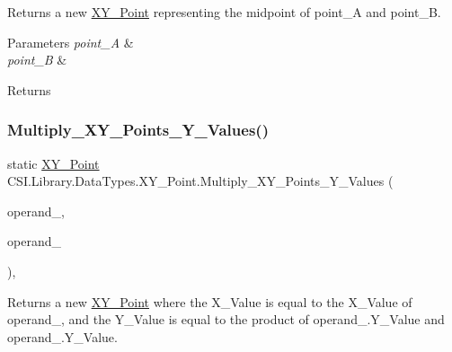 Returns a new \mbox{\hyperlink{struct_c_s_i_1_1_library_1_1_data_types_1_1_x_y___point}{X\+Y\+\_\+\+Point}} representing the midpoint of point\+\_\+A and point\+\_\+B. 


\begin{DoxyParams}{Parameters}
{\em point\+\_\+A} & \\
\hline
{\em point\+\_\+B} & \\
\hline
\end{DoxyParams}
\begin{DoxyReturn}{Returns}

\end{DoxyReturn}
\mbox{\label{struct_c_s_i_1_1_library_1_1_data_types_1_1_x_y___point_ab302194d8398608888249acc07a0b749}} 
\subsubsection{\texorpdfstring{Multiply\_XY\_Points\_Y\_Values()}{Multiply\_XY\_Points\_Y\_Values()}}
{\footnotesize\ttfamily static \mbox{\hyperlink{struct_c_s_i_1_1_library_1_1_data_types_1_1_x_y___point}{X\+Y\+\_\+\+Point}} C\+S\+I.\+Library.\+Data\+Types.\+X\+Y\+\_\+\+Point.\+Multiply\+\_\+\+X\+Y\+\_\+\+Points\+\_\+\+Y\+\_\+\+Values (\begin{DoxyParamCaption}\item[{\mbox{\hyperlink{struct_c_s_i_1_1_library_1_1_data_types_1_1_x_y___point}{X\+Y\+\_\+\+Point}}}]{operand\+\_,  }\item[{\mbox{\hyperlink{struct_c_s_i_1_1_library_1_1_data_types_1_1_x_y___point}{X\+Y\+\_\+\+Point}}}]{operand\+\_ }\end{DoxyParamCaption})\hspace{0.3cm}{\ttfamily [inline]}, {\ttfamily [static]}}



Returns a new \mbox{\hyperlink{struct_c_s_i_1_1_library_1_1_data_types_1_1_x_y___point}{X\+Y\+\_\+\+Point}} where the X\+\_\+\+Value is equal to the X\+\_\+\+Value of operand\+\_, and the Y\+\_\+\+Value is equal to the product of operand\+\_.\+Y\+\_\+\+Value and operand\+\_.\+Y\+\_\+\+Value. 


